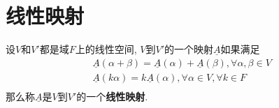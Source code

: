 \section{线性映射}

\begin{Definition}[线性映射]
设$V$和$V'$都是域$F$上的线性空间, $V$到$V'$的一个映射$\underline{A}$如果满足
\[
\begin{aligned}
  \underline{A}(\alpha + \beta) = \underline{A}(\alpha) + \underline{A}(\beta), \forall \alpha, \beta \in V \\
  \underline{A}{(k \alpha)} = k \underline{A}(\alpha), \forall \alpha \in V, \forall k \in F \\
\end{aligned}
\]
那么称$\underline{A}$是$V$到$V'$的一个\textbf{线性映射}.
\end{Definition}